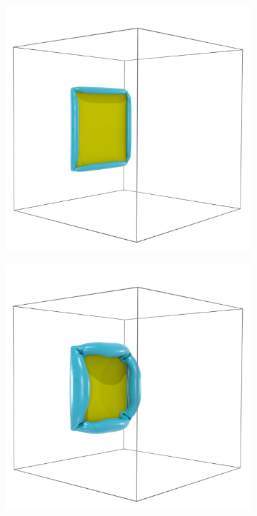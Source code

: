 \documentclass{article}
\begin{document}
\begin{figure}
    \centering
    \begin{subfigure}{.33\textwidth}
        \centering
        \includegraphics[width=\textwidth]{tex/fig/disk_high_re_2.png}
    \end{subfigure}%
    \begin{subfigure}{.33\textwidth}
        \centering
        \includegraphics[width=\textwidth]{tex/fig/disk_high_re_3.png}

\end{subfigure}
\end{figure}
\end{document}
